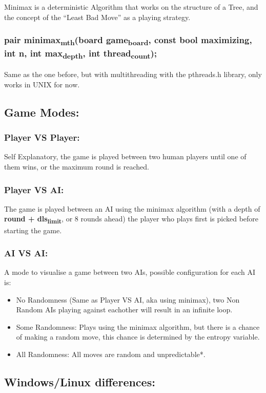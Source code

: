 \documentclass[11pt]{article}
\begin{document}
Minimax is a deterministic Algorithm that works on the structure of a Tree, and the concept of the ``Least Bad Move'' as a playing strategy.
\subsubsection{pair minimax\textsubscript{mth}(board game\textsubscript{board}, const bool maximizing, int n, int max\textsubscript{depth}, int thread\textsubscript{count});}
\label{sec:orgf635579}
Same as the one before, but with multithreading with the pthreads.h library, only works in UNIX for now.
\subsection{Game Modes:}
\label{sec:org36a3d68}
\subsubsection{Player VS Player:}
\label{sec:org887e3d0}
Self Explanatory, the game is played between two human players until one of them wins, or the maximum round is reached.
\subsubsection{Player VS AI:}
\label{sec:org9df0aec}
The game is played between an AI using the minimax algorithm (with a depth of \textbf{round + dls\textsubscript{limit}}, or 8 rounds ahead) the player who plays first is picked before starting the game.
\subsubsection{AI VS AI:}
\label{sec:orgcf44f8b}
A mode to visualise a game between two AIs, possible configuration for each AI is:
\begin{itemize}
\item No Randomness (Same as Player VS AI, aka using minimax), two Non Random AIs playing against eachother will result in an infinite loop.
\item Some Randomness: Plays using the minimax algorithm, but there is a chance of making a random move, this chance is determined by the entropy variable.
\item All Randomness: All moves are random and unpredictable*.
\end{itemize}
\subsection{Windows/Linux differences:}
\label{sec:orgce76880}
\end{document}

